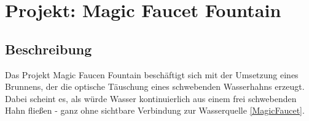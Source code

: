 %
%
%


\chapter{Projekt: Magic Faucet Fountain}


\section{Beschreibung}
Das Projekt Magic Faucen Fountain beschäftigt sich mit der Umsetzung eines Brunnens, der die optische Täuschung eines schwebenden Wasserhahns erzeugt. Dabei scheint es, als würde Wasser kontinuierlich aus einem frei schwebenden Hahn fließen - ganz ohne sichtbare Verbindung zur Wasserquelle \ref{MagicFaucet}.
